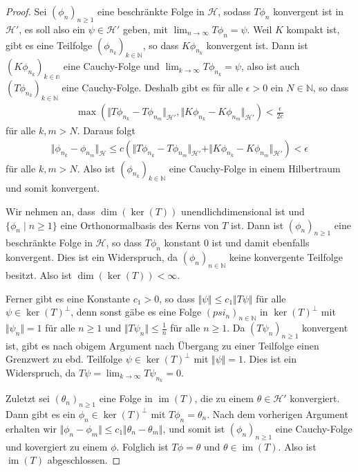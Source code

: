 \documentclass[11pt, hidelinks]{article}
\newcommand{\h}{\mathcal{H}}
\newcommand{\im}{\operatorname{im}}
\newcommand{\on}{{n \geq 1}}
\numberwithin{conj}{section}
\begin{document}
\begin{proof}
    Sei $(\phi_n)_{n \geq 1}$ eine beschränkte Folge in $\h$, sodass $T \phi_n$ konvergent ist in $\h'$, es soll also ein $\psi \in \h'$ geben, mit $\lim_{n\to\infty} T\phi_n = \psi$. Weil $K$ kompakt ist, gibt es eine Teilfolge $(\phi_{n_k})_{k \in \mathbb{N}}$, so dass $K \phi_{n_k}$ konvergent ist. Dann ist $(K\phi_{n_k})_{k \in \mathbb{n}}$ eine Cauchy-Folge und $\lim_{k\to\infty} T\phi_{n_k} = \psi$, also ist auch $(T\phi_{n_k})_{k\in\mathbb{N}}$ eine Cauchy-Folge. Deshalb gibt es für alle $\epsilon > 0$ ein $N\in \mathbb{N}$, so dass
    \begin{align}
        \max(\Vert T\phi_{n_k}-T\phi_{n_m} \Vert_{\h'}, \Vert K\phi_{n_k}-K\phi_{n_m} \Vert_{\h'}) < \frac{\epsilon}{2c}
    \end{align}
    für alle $k,m > N$. Daraus folgt
    \begin{align}
        \Vert \phi_{n_k} - \phi_{n_m} \Vert_\h \leq c (\Vert T\phi_{n_k}-T\phi_{n_m} \Vert_{\h'} +  \Vert K\phi_{n_k}-K\phi_{n_m} \Vert_{\h'}) < \epsilon
    \end{align}
    für alle $k,m > N$. Also ist $(\phi_{n_k})_{k \in \mathbb{N}}$ eine Cauchy-Folge in einem Hilbertraum und somit konvergent.

    Wir nehmen an, dass $\dim(\ker(T))$ unendlichdimensional ist und $\{\phi_n \;\vert\; n \geq 1\}$ eine Orthonormalbasis des Kerns von $T$ ist. Dann ist $(\phi_n)_{n \geq 1}$ eine beschränkte Folge in $\h$, so dass $T \phi_n$ konstant $0$ ist und damit ebenfalls konvergent. Dies ist ein Widerspruch, da $(\phi_n)_{n\in \mathbb{N}}$ keine konvergente Teilfolge besitzt. Also ist $\dim(\ker(T)) < \infty$.

    Ferner gibt es eine Konstante $c_1 > 0$, so dass $\Vert \psi \Vert \leq c_1 \Vert T\psi \Vert$ für alle $\psi \in \ker(T)^\perp$, denn sonst gäbe es eine Folge $(psi_n)_{n\in\mathbb{N}}$ in $\ker(T)^\perp$ mit $\Vert \psi_n \Vert = 1$ für alle $n \geq 1$ und $\Vert T\psi_n \Vert \leq \frac{1}{n}$ für alle $n \geq 1$. Da $(T\psi_n)_\on$ konvergent ist, gibt es nach obigem Argument nach Übergang zu einer Teilfolge einen Grenzwert zu ebd. Teilfolge $\psi \in \ker(T)^\perp$ mit $\Vert \psi \Vert = 1$. Dies ist ein Widerspruch, da $T \psi = \lim_{k\to\infty} T \psi_{n_k} = 0$.

    Zuletzt sei $(\theta_n)_{n \geq 1}$ eine Folge in $\im(T)$, die zu einem $\theta \in \h'$ konvergiert. Dann gibt es ein $\phi_n \in \ker(T)^\perp$ mit $T\phi_n = \theta_n$. Nach dem vorherigen Argument erhalten wir $\Vert\phi_n-\phi_m\Vert \leq c_1 \Vert \theta_n - \theta_m \Vert$, und somit ist $(\phi_n)_{n\geq 1}$ eine Cauchy-Folge und kovergiert zu einem $\phi$. Folglich ist $T\phi = \theta$ und $\theta \in \im(T)$. Also ist $\im(T)$ abgeschlossen.
\end{proof}
\end{document}
